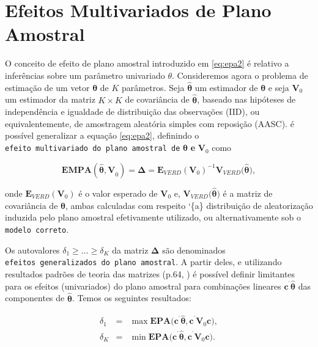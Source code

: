 \documentclass[]{book}
\theoremstyle{definition}
\theoremstyle{definition}
\theoremstyle{definition}
\theoremstyle{remark}
\begin{document}
\section{Efeitos Multivariados de Plano
Amostral}\label{efeitos-multivariados-de-plano-amostral}

O conceito de efeito de plano amostral introduzido em \eqref{eq:epa2} é
relativo a inferências sobre um parâmetro univariado \(\theta\).
Consideremos agora o problema de estimação de um vetor
\(\mathbf{\theta}\) de \(K\) parâmetros. Seja \(\mathbf{\hat{\theta}}\)
um estimador de \(\mathbf{\theta}\) e seja \(\mathbf{V}_{0}\) um
estimador da matriz \(K\times K\) de covariância de
\(\mathbf{\hat{\theta}}\), baseado nas hipóteses de independência e
igualdade de distribuição das observações (IID), ou equivalentemente, de
amostragem aleatória simples com reposição (AASC). é possível
generalizar a equação \eqref{eq:epa2}, definindo o
\texttt{efeito\ multivariado\ do\ plano\ amostral\ de}
\(\mathbf{\hat{\theta}}\) \textbf{e} \(\mathbf{V}_{0}\) como

\begin{equation}
\mathbf{EMPA}(\mathbf{\hat{\theta},V}_{0})=\mathbf{\Delta =E}_{VERD}\left( 
\mathbf{V}_{0}\right) ^{-1}\mathbf{V}_{VERD}(\mathbf{\hat{\theta}),}
\label{eq:epa6}
\end{equation}

onde \(\mathbf{E}_{VERD}\left( \mathbf{V}_{0}\right)\) é o valor
esperado de \(\mathbf{V}_{0}\) e,
\(\mathbf{V}_{VERD}(\mathbf{\hat{\theta})}\) é a matriz de covariância
de \(\mathbf{\hat{\theta}}\), ambas calculadas com respeito `\{a\}
distribuição de aleatorização induzida pelo plano amostral efetivamente
utilizado, ou alternativamente sob o \texttt{modelo\ correto}.

Os autovalores \(\delta _{1}\geq \ldots \geq \delta _{K}\) da matriz
\(\mathbf{\Delta }\) são denominados
\texttt{efeitos\ generalizados\ do\ plano\ amostral}. A partir deles, e
utilizando resultados padrões de teoria das matrizes (p.64,
\citep{Johnson}) é possível definir limitantes para os efeitos
(univariados) do plano amostral para combinações lineares
\(\mathbf{c}^{^{\prime }}\widehat{\mathbf{\theta }}\) das componentes de
\(\widehat{\mathbf{\theta }}\). Temos os seguintes resultados:

\begin{eqnarray*}
\delta _{1} &=&\max \mathbf{EPA}(\mathbf{c}^{^{\prime }}\widehat{\mathbf{
\theta }}\mathbf{,c}^{^{\prime }}\mathbf{V}_{0}\mathbf{c)}, \\
\delta _{K} &=&\min \mathbf{EPA}(\mathbf{c}^{^{\prime }}\widehat{\mathbf{\theta }}\mathbf{,c}^{^{\prime }}\mathbf{V}_{0}\mathbf{c)}.
\end{eqnarray*}
\end{document}
